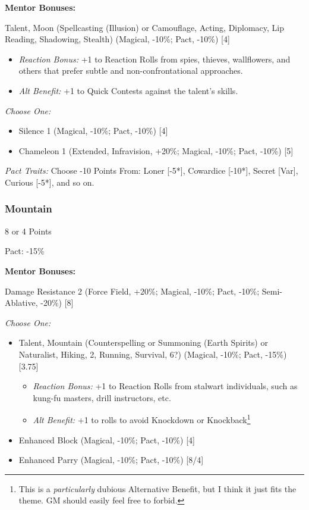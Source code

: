 \begin{multicols}{3}
	
	\textbf{Mentor Bonuses:} 
	
	Talent, Moon (Spellcasting (Illusion) or Camouflage, Acting, Diplomacy, Lip Reading, Shadowing, Stealth) (Magical, -10\%; Pact, -10\%) [4]
	\begin{itemize}
		\itemsep 0pt
		\item \textit{Reaction Bonus:} +1 to Reaction Rolls from spies, thieves, wallflowers, and others that prefer subtle and non-confrontational approaches.
		\item \textit{Alt Benefit:} +1 to Quick Contests against the talent's skills.
	\end{itemize}
	
	\textit{Choose One:}
	\begin{itemize}
		\itemsep 0pt
		\item Silence 1 (Magical, -10\%; Pact, -10\%) [4]
		\item Chameleon 1 (Extended, Infravision, +20\%; Magical, -10\%; Pact, -10\%) [5]
	\end{itemize}
	
	\textit{Pact Traits:} Choose -10 Points From: Loner [-5*], Cowardice [-10*], Secret [Var], Curious [-5*], and so on. 
	
	\subsubsection{Mountain}
	\begin{flushright}
		8 or 4 Points
	\end{flushright}
	Pact: -15\%
	
	
	\textbf{Mentor Bonuses:} 
	
	Damage Resistance 2 (Force Field, +20\%; Magical, -10\%; Pact, -10\%; Semi-Ablative, -20\%) [8]
	
	\textit{Choose One:}
	\begin{itemize}
		\itemsep 0pt
		\item Talent, Mountain (Counterspelling or Summoning (Earth Spirits) or Naturalist, Hiking, 2, Running, Survival, 6?) (Magical, -10\%; Pact, -15\%) [3.75]
		\begin{itemize}
			\itemsep 0pt
			\item \textit{Reaction Bonus:} +1 to Reaction Rolls from stalwart individuals, such as kung-fu masters, drill instructors, etc.
			\item \textit{Alt Benefit:} +1 to rolls to avoid Knockdown or Knockback\footnote{This is a \textit{particularly} dubious Alternative Benefit, but I think it just fits the theme. GM should easily feel free to forbid.}
		\end{itemize}
		\item Enhanced Block (Magical, -10\%; Pact, -10\%) [4]
		\item Enhanced Parry (Magical, -10\%; Pact, -10\%) [8/4]
	\end{itemize}
	

\end{multicols}
